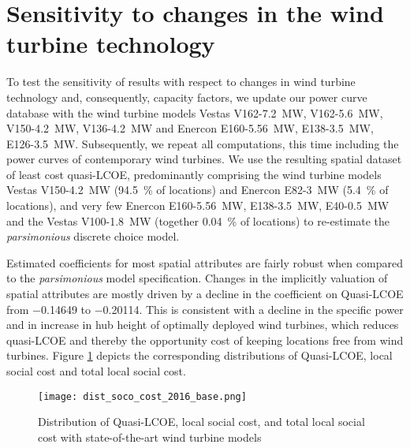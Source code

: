 \documentclass[review, a4paper, 12pt, authoryear, times]{elsarticle}
\begin{document}
\section{Sensitivity to changes in the wind turbine technology} \label{app:robust}
To test the sensitivity of results with respect to changes in wind turbine technology and, consequently, capacity factors, we update our power curve database with the wind turbine models Vestas V162-\SI{7.2}{\mega\watt}, V162-\SI{5.6}{\mega\watt}, V150-\SI{4.2}{\mega\watt}, V136-\SI{4.2}{\mega\watt} and Enercon E160-\SI{5.56}{\mega\watt}, E138-\SI{3.5}{\mega\watt}, E126-\SI{3.5}{\mega\watt}.
Subsequently, we repeat all computations, this time including the power curves of contemporary wind turbines.
We use the resulting spatial dataset of least cost quasi-LCOE, predominantly comprising the wind turbine models Vestas V150-\SI{4.2}{\mega\watt} (\SI{94.5}{\percent} of locations) and Enercon E82-\SI{3}{\mega\watt} (\SI{5.4}{\percent} of locations), and very few Enercon E160-\SI{5.56}{\mega\watt}, E138-\SI{3.5}{\mega\watt}, E40-\SI{0.5}{\mega\watt} and the Vestas V100-\SI{1.8}{\mega\watt} (together \SI{0.04}{\percent} of locations) to re-estimate the \emph{parsimonious} discrete choice model. 



Estimated coefficients for most spatial attributes are fairly robust when compared to the \emph{parsimonious} model specification.
Changes in the implicitly valuation of spatial attributes are mostly driven by a decline in the coefficient on Quasi-LCOE from \num{-0.14649} to \num{-0.20114}.
This is consistent with a decline in the specific power and in increase in hub height of optimally deployed wind turbines, which reduces quasi-LCOE and thereby the opportunity cost of keeping locations free from wind turbines.
Figure \ref{fig:dist-sens} depicts the corresponding distributions of Quasi-LCOE, local social cost and total local social cost.

\begin{figure}[h!]
    \centering
    \texttt{[image: dist\_soco\_cost\_2016\_base.png]}
    \caption{Distribution of Quasi-LCOE, local social cost, and total local social cost with state-of-the-art wind turbine models}
    \label{fig:dist-sens}
\end{figure}
\end{document}
